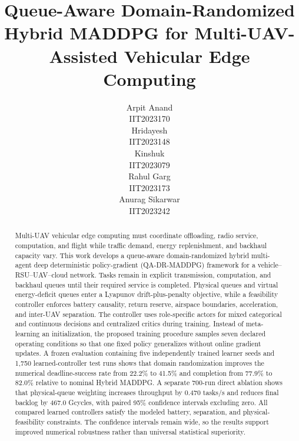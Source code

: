 \documentclass[journal]{IEEEtran}
\newcommand{\method}{QA-DR-MADDPG}
\begin{document}
\title{Queue-Aware Domain-Randomized Hybrid MADDPG for Multi-UAV-Assisted Vehicular Edge Computing}

\author{
\begin{tabular}[t]{c}Arpit Anand\\IIT2023170\end{tabular}\quad
\begin{tabular}[t]{c}Hridayesh\\IIT2023148\end{tabular}\quad
\begin{tabular}[t]{c}Kinshuk\\IIT2023079\end{tabular}\quad
\begin{tabular}[t]{c}Rahul Garg\\IIT2023173\end{tabular}\quad
\begin{tabular}[t]{c}Anurag Sikarwar\\IIT2023242\end{tabular}
}

\maketitle

\begin{abstract}
Multi-UAV vehicular edge computing must coordinate offloading, radio service,
computation, and flight while traffic demand, energy replenishment, and
backhaul capacity vary. This work develops a queue-aware
domain-randomized hybrid multi-agent deep deterministic policy-gradient
(\method) framework for a vehicle--RSU--UAV--cloud network. Tasks remain in
explicit transmission, computation, and backhaul queues until their required
service is completed. Physical queues and virtual energy-deficit queues enter
a Lyapunov drift-plus-penalty objective, while a feasibility controller
enforces battery causality, return reserve, airspace boundaries, acceleration,
and inter-UAV separation. The controller uses role-specific actors for mixed
categorical and continuous decisions and centralized critics during training.
Instead of meta-learning an initialization, the proposed training procedure
samples seven declared operating conditions so that one fixed policy
generalizes without online gradient updates. A frozen evaluation containing
five independently trained learner seeds and 1,750 learned-controller test
runs shows that domain
randomization improves the numerical deadline-success rate from 22.2\% to
41.5\% and completion from 77.9\% to 82.0\% relative to nominal Hybrid
MADDPG. A separate 700-run direct ablation shows that physical-queue
weighting increases throughput by 0.470 tasks/s and reduces final backlog by
467.0 Gcycles, with paired 95\% confidence intervals excluding zero. All
compared learned controllers satisfy the modeled battery,
separation, and physical-feasibility constraints. The confidence intervals
remain wide, so the results support improved numerical robustness rather than
universal statistical superiority.
\end{abstract}
\end{document}
